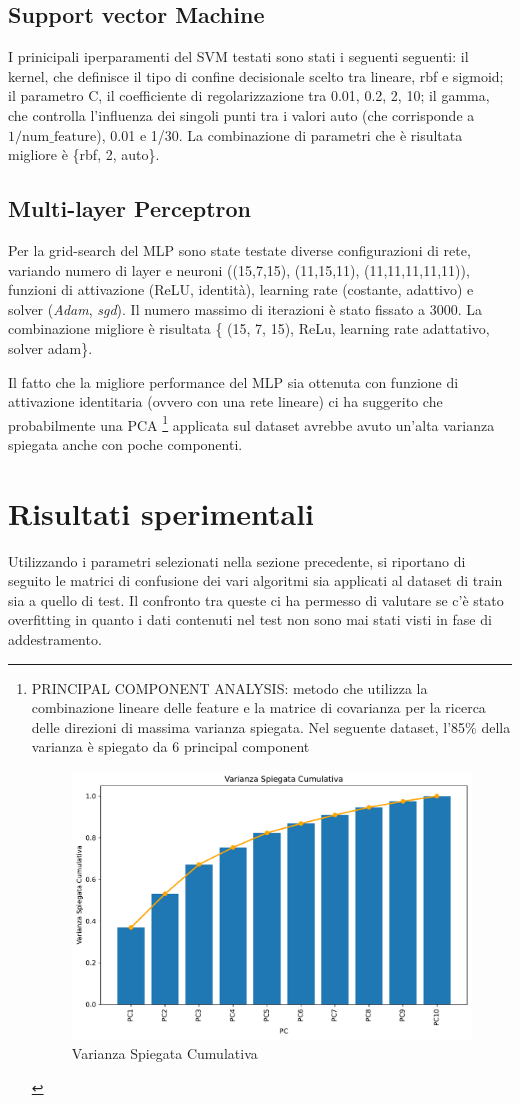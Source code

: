 \documentclass[conference]{IEEEtran}
\begin{document}
\subsection{Support vector Machine}
I prinicipali iperparamenti del SVM testati sono stati i seguenti seguenti: il kernel, che definisce il tipo di confine decisionale scelto tra lineare, rbf e sigmoid; il parametro C, il coefficiente di regolarizzazione tra 0.01, 0.2, 2, 10; il gamma, che controlla l’influenza dei singoli punti tra i valori auto (che corrisponde a $1 / \text{num\_feature}$), 0.01 e 1/30. La combinazione di parametri che è risultata migliore è \{rbf, 2, auto\}.

\subsection{Multi-layer Perceptron}
Per la grid-search del MLP sono state testate diverse configurazioni di rete, variando numero di layer e neuroni ((15,7,15), (11,15,11), (11,11,11,11,11)), funzioni di attivazione (ReLU, identità), learning rate (costante, adattivo) e solver (\textit{Adam}, \textit{sgd}). Il numero massimo di iterazioni è stato fissato a 3000.
La combinazione migliore è risultata \{ (15, 7, 15), ReLu, learning rate adattativo, solver adam\}.

Il fatto che la migliore performance del MLP sia ottenuta con funzione di attivazione identitaria (ovvero con una rete lineare) ci ha suggerito che probabilmente una PCA \footnote{PRINCIPAL COMPONENT ANALYSIS: metodo che utilizza la combinazione lineare delle feature e la matrice di covarianza per la ricerca delle direzioni di massima varianza spiegata. Nel seguente dataset, l'85\% della varianza è spiegato da 6 principal component
\begin{figure} [H]
    \centering
    \includegraphics[width=0.3\linewidth]{varianzaSpiegataCumulativa.pdf}
    \caption{\footnotesize Varianza Spiegata Cumulativa }
    \label{varianzaSpiegataCumulativa}
\end{figure}}
applicata sul dataset avrebbe avuto un'alta varianza spiegata anche con poche componenti.


\section{Risultati sperimentali}
Utilizzando i parametri selezionati nella sezione precedente, si riportano di seguito le matrici di confusione dei vari algoritmi sia applicati al dataset di train sia a quello di test. Il confronto tra queste ci ha permesso di valutare se c'è stato overfitting in quanto i dati contenuti nel test non sono mai stati visti in fase di addestramento. 
\end{document}

